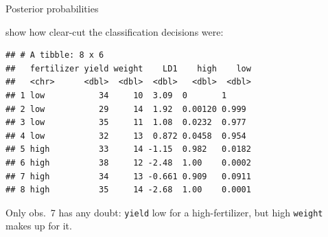 \documentclass[
  ignorenonframetext,
]{beamer}
\newenvironment{Shaded}{\begin{snugshade}}{\end{snugshade}}
\newcommand{\DecValTok}[1]{\textcolor[rgb]{0.00,0.00,0.81}{#1}}
\newcommand{\KeywordTok}[1]{\textcolor[rgb]{0.13,0.29,0.53}{\textbf{#1}}}
\newcommand{\NormalTok}[1]{#1}
\newcommand{\OperatorTok}[1]{\textcolor[rgb]{0.81,0.36,0.00}{\textbf{#1}}}
\newcommand{\StringTok}[1]{\textcolor[rgb]{0.31,0.60,0.02}{#1}}
\begin{document}
\begin{frame}[fragile]{Posterior probabilities}
\protect\hypertarget{posterior-probabilities}{}

show how clear-cut the classification decisions were:

\small

\begin{Shaded}
\end{Shaded}

\begin{verbatim}
## # A tibble: 8 x 6
##   fertilizer yield weight    LD1    high    low
##   <chr>      <dbl>  <dbl>  <dbl>   <dbl>  <dbl>
## 1 low           34     10  3.09  0       1     
## 2 low           29     14  1.92  0.00120 0.999 
## 3 low           35     11  1.08  0.0232  0.977 
## 4 low           32     13  0.872 0.0458  0.954 
## 5 high          33     14 -1.15  0.982   0.0182
## 6 high          38     12 -2.48  1.00    0.0002
## 7 high          34     13 -0.661 0.909   0.0911
## 8 high          35     14 -2.68  1.00    0.0001
\end{verbatim}

\normalsize

Only obs.~7 has any doubt: \texttt{yield} low for a high-fertilizer, but
high \texttt{weight} makes up for it.

\end{frame}
\end{document}
